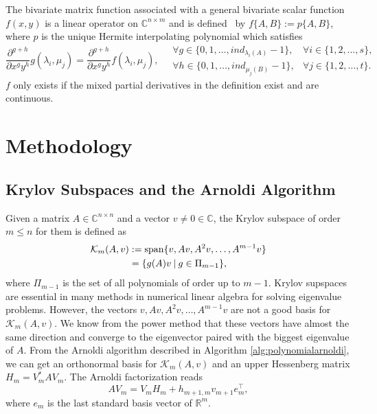 The bivariate matrix function associated with a general bivariate scalar function $f(x, y)$ is a linear
operator on $\mathbb{C}^{n \times m}$ and is defined~\cite{kressner2014bivariate} by
$f\{A, B\} := p\{A, B\}$, where $p$ is the unique Hermite interpolating polynomial which
satisfies
\begin{equation*}
    \frac{\partial^{g+h}}{\partial x^g y^h}g(\lambda_i, \mu_j)
    = \frac{\partial^{g+h}}{\partial x^g y^h}f(\lambda_i, \mu_j),
    \quad
    \begin{matrix}
        \forall g \in \{0, 1, \dots, ind_{\lambda_i(A)}-1\},
        & \forall i \in \{1, 2, \dots, s\},
        \\
        \forall h \in \{0, 1, \dots, ind_{\mu_j(B)}-1\},
        & \forall j \in \{1, 2, \dots, t\}.
    \end{matrix}
\end{equation*}
$f$ only exists if the mixed partial derivatives in the definition exist and are continuous.

\section{Methodology}\label{sec:methods}

\subsection{Krylov Subspaces and the Arnoldi Algorithm}\label{sec:arnoldi}
Given a matrix $A \in \mathbb{C}^{n \times n}$ and a vector $v \neq 0 \in \mathbb{C}$, the Krylov subspace of order
$m \leq n$ for them is defined \cite{golub2013matrix} as
\begin{equation}
    \label{eq:krylovsubspacedefinition}
    \begin{aligned}
        \mathcal{K}_m(A, v) & := \operatorname{span}\{v, Av, A^{2}v, \dots, A^{m-1}v \}\\
         & = \{g(A)v \:|\: g \in \Pi_{m-1} \},
    \end{aligned}
\end{equation}
where $\Pi_{m-1}$ is the set of all polynomials of order up to $m-1$.
Krylov supspaces are essential in many methods in numerical linear algebra for solving eigenvalue problems.
However, the vectors $v, Av, A^{2}v, \dots, A^{m-1}v$ are not a good basis for $\mathcal{K}_m(A, v)$. We
know from the power method that these vectors have almost the same direction and converge to the eigenvector
paired with the biggest eigenvalue of $A$. From the Arnoldi algorithm \cite{trefethen1997numerical} described in
Algorithm \ref{alg:polynomialarnoldi}, we can get an orthonormal basis for $\mathcal{K}_m(A, v)$ and an upper Hessenberg
matrix $H_m = V_m^* A V_m$. The Arnoldi factorization reads
\begin{equation}
    \label{eq:arnoldifactorization}
    A V_m = V_m H_m + h_{m+1, m} v_{m+1} e_m^\top,
\end{equation}
where $e_m$ is the last standard basis vector of $\mathbb{R}^{m}$.

